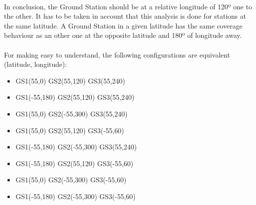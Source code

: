 \documentclass[12pt,a4paper]{report}
\begin{document}
\paragraph{}
In conclusion, the Ground Station should be at a relative longitude of 120º one to the other. It has to be taken in account that this analysis is done for stations at the same latitude. A Ground Station in a given latitude has the same coverage behaviour as an other one at the opposite latitude and 180º of longitude away.
\paragraph{}
For making easy to understand, the following configurations are equivalent (latitude, longitude):
\begin{itemize}
\item GS1(55,0) 	GS2(55,120)		GS3(55,240)
\item GS1(-55,180) 	GS2(55,120) 	GS3(55,240)
\item GS1(55,0) 	GS2(-55,300) 	GS3(55,240)
\item GS1(55,0) 	GS2(55,120) 	GS3(-55,60)
\item GS1(-55,180) 	GS2(-55,300) 	GS3(55,240)
\item GS1(-55,180) 	GS2(55,120) 	GS3(-55,60)
\item GS1(55,0) 	GS2(-55,300) 	GS3(-55,60)
\item GS1(-55,180) 	GS2(-55,300) 	GS3(-55,60)
\end{itemize}
\end{document}
